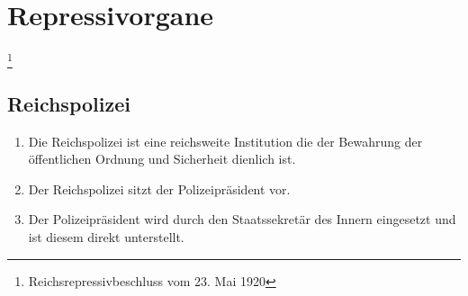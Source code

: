 \documentclass{article}
\begin{document}
\section{Repressivorgane}\footnote{Reichsrepressivbeschluss vom 23. Mai 1920}
\subsection{Reichspolizei}
\begin{enumerate}[(1)]
    \item Die Reichspolizei ist eine reichsweite Institution die der Bewahrung der öffentlichen Ordnung und Sicherheit dienlich ist.
    \item Der Reichspolizei sitzt der Polizeipräsident vor.
    \item Der Polizeipräsident wird durch den Staatssekretär des Innern eingesetzt und ist diesem direkt unterstellt.
\end{enumerate}
\end{document}
